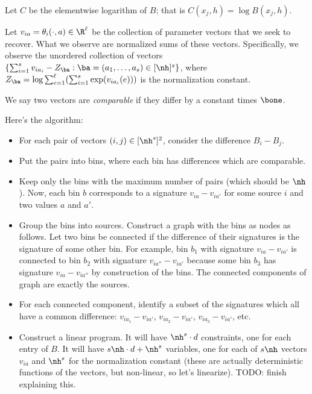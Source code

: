 Let $C$ be the elementwise logarithm of $B$; that is
$C(x_j, h) = \log B(x_j, h)$.

Let $v_{ia} = \theta_i(\cdot, a) \in \R^\ell$ be the collection of parameter vectors that we seek to recover.
What we observe are normalized sums of these vectors.
Specifically, we observe the unordered collection of vectors $\{ \sum_{i=1}^s v_{ia_i} - Z_{\ba} : \ba = (a_1, \dots, a_s) \in [\nh]^s \}$,
where $Z_{\ba} = \log \sum_{e=1}^\ell (\sum_{i=1}^s \exp(v_{ia_i}(e)))$ is the normalization constant.

We say two vectors are \emph{comparable} if they differ by a constant times $\bone$.

Here's the algorithm:
\begin{itemize}
  \item For each pair of vectors $(i,j) \in [\nh^s]^2$, consider the difference $B_i - B_j$.
  \item Put the pairs into bins, where each bin has differences which are comparable.
  \item Keep only the bins with the maximum number of pairs (which should be $\nh$).
  Now, each bin $b$ corresponds to a signature $v_{ia} - v_{ia'}$ for some source $i$ and two values $a$ and $a'$.
  \item Group the bins into sources.
  Construct a graph with the bins as nodes as follows.
  Let two bins be connected if the difference of their signatures is the signature of some other bin.
  For example, bin $b_1$ with signature $v_{ia} - v_{ia'}$
  is connected to bin $b_2$ with signature $v_{ia''} - v_{ia'}$
  because some bin $b_3$ has signature $v_{ia} - v_{ia''}$ by construction of the bins.
  The connected components of graph are exactly the sources.
  \item For each connected component, identify a subset of the signatures which all have a common difference:
  $v_{ia_1} - v_{ia'}$, $v_{ia_2} - v_{ia'}$, $v_{ia_3} - v_{ia'}$, etc.
  \item Construct a linear program.  It will have $\nh^s \cdot d$ constraints, one for each entry of $B$.
  It will have $s\nh \cdot d + \nh^s$ variables,
  one for each of $s\nh$ vectors $v_{ia}$ and $\nh^s$ for the normalization constant
  (these are actually deterministic functions of the vectors, but non-linear, so let's linearize).
  TODO: finish explaining this.
\end{itemize}
